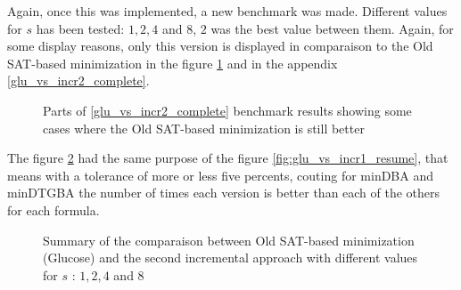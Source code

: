 Again, once this was implemented, a new benchmark was made. Different values for $s$ has been tested:
$1, 2, 4$ and $8$, $2$ was the best value between them. Again, for some display reasons, only this version
is displayed in comparaison to the Old SAT-based minimization in the figure \ref{fig:glu_vs_incr2_short}
and in the appendix \ref{glu_vs_incr2_complete}.

\begin{figure}[H]
 \centering
 \fontsize{9}{11}
 \caption{Parts of \ref{glu_vs_incr2_complete} benchmark results showing some cases where the Old SAT-based
          minimization is still better}
 \label{fig:glu_vs_incr2_short}
\end{figure}

The figure \ref{fig:glu_vs_incr2_resume} had the same purpose of the figure
\ref{fig:glu_vs_incr1_resume}, that means with a tolerance of more or less five percents, couting
for minDBA and minDTGBA the number of times each version is better than each of the others for
each formula.\\

\begin{figure}[H]
 \centering
 
 \caption{Summary of the comparaison between Old SAT-based minimization (Glucose) and the second incremental
          approach with different values for $s$ : $1, 2, 4$ and $8$}
 \label{fig:glu_vs_incr2_resume}
\end{figure}

